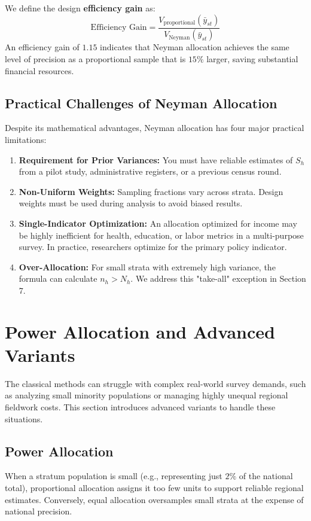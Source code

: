 \documentclass[11pt, a4paper]{article}
\begin{document}
We define the design \textbf{efficiency gain} as:
\begin{equation}
    \text{Efficiency Gain} = \frac{V_{\text{proportional}}(\bar{y}_{st})}{V_{\text{Neyman}}(\bar{y}_{st})}
\end{equation}
An efficiency gain of $1.15$ indicates that Neyman allocation achieves the same level of precision as a proportional sample that is $15\%$ larger, saving substantial financial resources.

\subsection{Practical Challenges of Neyman Allocation}
Despite its mathematical advantages, Neyman allocation has four major practical limitations:
\begin{enumerate}
    \item \textbf{Requirement for Prior Variances:} You must have reliable estimates of $S_h$ from a pilot study, administrative registers, or a previous census round.
    \item \textbf{Non-Uniform Weights:} Sampling fractions vary across strata. Design weights must be used during analysis to avoid biased results.
    \item \textbf{Single-Indicator Optimization:} An allocation optimized for income may be highly inefficient for health, education, or labor metrics in a multi-purpose survey. In practice, researchers optimize for the primary policy indicator.
    \item \textbf{Over-Allocation:} For small strata with extremely high variance, the formula can calculate $n_h > N_h$. We address this "take-all" exception in Section 7.
\end{enumerate}

\newpage

\section{Power Allocation and Advanced Variants}

The classical methods can struggle with complex real-world survey demands, such as analyzing small minority populations or managing highly unequal regional fieldwork costs. This section introduces advanced variants to handle these situations.

\subsection{Power Allocation}
When a stratum population is small (e.g., representing just $2\%$ of the national total), proportional allocation assigns it too few units to support reliable regional estimates. Conversely, equal allocation oversamples small strata at the expense of national precision.
\end{document}
